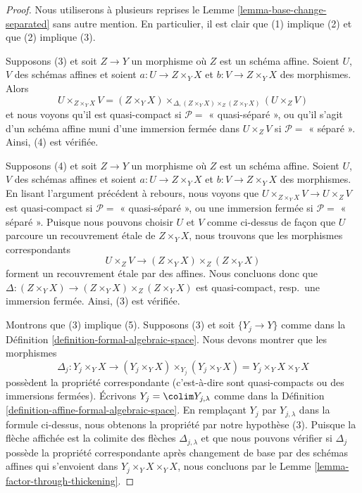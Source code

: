 \begin{proof}
Nous utiliserons à plusieurs reprises le
Lemme \ref{lemma-base-change-separated}
sans autre mention. En particulier, il est clair que
(1) implique (2) et que (2) implique (3).

\medskip\noindent
Supposons (3) et soit $Z \to Y$ un morphisme où $Z$ est un schéma affine.
Soient $U$, $V$ des schémas affines et soient $a : U \to Z \times_Y X$
et $b : V \to Z \times_Y X$ des morphismes. Alors
$$
U \times_{Z \times_Y X} V =
(Z \times_Y X) \times_{\Delta, (Z \times_Y X) \times_Z (Z \times_Y X)}
(U \times_Z V)
$$
et nous voyons qu'il est quasi-compact si $\mathcal{P} =$ « quasi-séparé »,
ou qu'il s'agit d'un schéma affine muni d'une immersion fermée dans
$U \times_Z V$ si $\mathcal{P} =$ « séparé ». Ainsi, (4) est vérifiée.

\medskip\noindent
Supposons (4) et soit $Z \to Y$ un morphisme où $Z$ est un schéma affine.
Soient $U$, $V$ des schémas affines et soient $a : U \to Z \times_Y X$
et $b : V \to Z \times_Y X$ des morphismes. En lisant l'argument précédent
à rebours, nous voyons que $U \times_{Z \times_Y X} V \to U \times_Z V$
est quasi-compact si $\mathcal{P} =$ « quasi-séparé », ou une immersion
fermée si $\mathcal{P} =$ « séparé ». Puisque nous pouvons choisir $U$ et
$V$ comme ci-dessus de façon que $U$ parcoure un
recouvrement étale de $Z \times_Y X$, nous trouvons
que les morphismes correspondants
$$
U \times_Z V \to (Z \times_Y X) \times_Z (Z \times_Y X)
$$
forment un recouvrement étale par des affines. Nous concluons donc que
$\Delta : (Z \times_Y X) \to (Z \times_Y X) \times_Z (Z \times_Y X)$
est quasi-compact, resp.\ une immersion fermée. Ainsi, (3) est vérifiée.

\medskip\noindent
Montrons que (3) implique (5). Supposons (3) et soit
$\{Y_j \to Y\}$ comme dans la
Définition \ref{definition-formal-algebraic-space}.
Nous devons montrer que les morphismes
$$
\Delta_j :
Y_j \times_Y X
\longrightarrow
(Y_j \times_Y X) \times_{Y_j} (Y_j \times_Y X) =
Y_j \times_Y X \times_Y X
$$
possèdent la propriété correspondante (c'est-à-dire sont quasi-compacts ou des immersions fermées).
Écrivons $Y_j = \colim Y_{j, \lambda}$ comme dans la
Définition \ref{definition-affine-formal-algebraic-space}.
En remplaçant $Y_j$ par $Y_{j, \lambda}$ dans la formule ci-dessus, nous obtenons la
propriété par notre hypothèse (3). Puisque la flèche affichée
est la colimite des flèches $\Delta_{j, \lambda}$ et que nous
pouvons vérifier si $\Delta_j$ possède la propriété correspondante
après changement de base par des schémas affines qui s'envoient dans
$Y_j \times_Y X \times_Y X$, nous concluons par le
Lemme \ref{lemma-factor-through-thickening}.


\end{proof}
